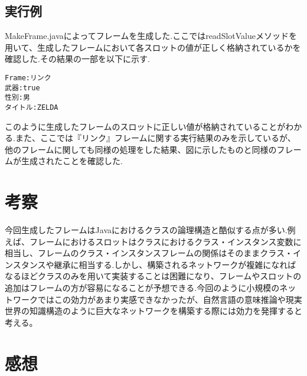 \documentclass[a4j]{jarticle}
\begin{document}
\subsection{実行例}
MakeFrame.javaによってフレームを生成した.ここではreadSlotValueメソッドを用いて、生成したフレームにおいて各スロットの値が正しく格納されているかを確認した.その結果の一部を以下に示す.
\\

\begin{screen}
\begin{verbatim}
Frame:リンク
武器:true
性別:男
タイトル:ZELDA
\end{verbatim}
\end{screen}

このように生成したフレームのスロットに正しい値が格納されていることがわかる.また、ここでは『リンク』フレームに関する実行結果のみを示しているが、他のフレームに関しても同様の処理をした結果、図に示したものと同様のフレームが生成されたことを確認した.

\section{考察}
今回生成したフレームはJavaにおけるクラスの論理構造と酷似する点が多い.例えば、フレームにおけるスロットはクラスにおけるクラス・インスタンス変数に相当し、フレームのクラス・インスタンスフレームの関係はそのままクラス・インスタンスや継承に相当する.しかし、構築されるネットワークが複雑になればなるほどクラスのみを用いて実装することは困難になり、フレームやスロットの追加はフレームの方が容易になることが予想できる.今回のように小規模のネットワークではこの効力があまり実感できなかったが、自然言語の意味推論や現実世界の知識構造のように巨大なネットワークを構築する際には効力を発揮すると考える。

\section{感想}
\end{document}
